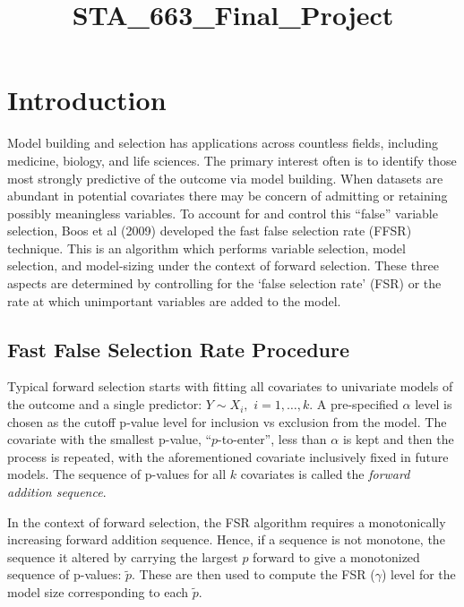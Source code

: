 \documentclass{article}
\title{STA\_663\_Final\_Project}
\begin{document}
    
    
    \maketitle
    
    

    
    \section{Introduction}\label{introduction}

Model building and selection has applications across countless fields,
including medicine, biology, and life sciences. The primary interest
often is to identify those most strongly predictive of the outcome via
model building. When datasets are abundant in potential covariates there
may be concern of admitting or retaining possibly meaningless variables.
To account for and control this ``false'' variable selection, Boos et al
(2009) developed the fast false selection rate (FFSR) technique. This is
an algorithm which performs variable selection, model selection, and
model-sizing under the context of forward selection. These three aspects
are determined by controlling for the `false selection rate' (FSR) or
the rate at which unimportant variables are added to the model.

    \subsection{Fast False Selection Rate
Procedure}\label{fast-false-selection-rate-procedure}

Typical forward selection starts with fitting all covariates to
univariate models of the outcome and a single predictor: $Y \sim X_i,$
$i = 1,\ldots,k$. A pre-specified $\alpha$ level is chosen as the cutoff
p-value level for inclusion vs exclusion from the model. The covariate
with the smallest p-value, ``$p$-to-enter'', less than $\alpha$ is kept
and then the process is repeated, with the aforementioned covariate
inclusively fixed in future models. The sequence of p-values for all $k$
covariates is called the \textit{forward addition sequence}.

In the context of forward selection, the FSR algorithm requires a
monotonically increasing forward addition sequence. Hence, if a sequence
is not monotone, the sequence it altered by carrying the largest $p$
forward to give a monotonized sequence of p-values: $\tilde{p}.$ These
are then used to compute the FSR ($\gamma$) level for the model size
corresponding to each $\tilde{p}.$
\end{document}
